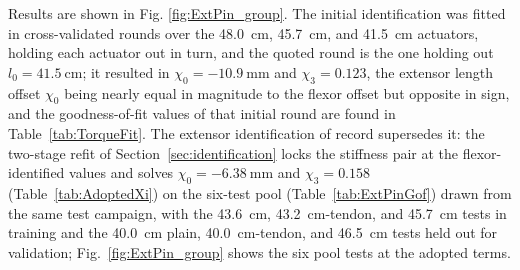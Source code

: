 Results are shown in Fig. \ref{fig:ExtPin_group}. The initial identification was fitted in cross-validated rounds over the \qty{48.0}{\cm}, \qty{45.7}{\cm}, and \qty{41.5}{\cm} actuators, holding each actuator out in turn, and the quoted round is the one holding out $l_{0}=\qty{41.5}{\cm}$; it resulted in $\chi_{0} = \qty{-10.9}{\mm}$ and $\chi_{3} = 0.123$, the extensor length offset $\chi_{0}$ being nearly equal in magnitude to the flexor offset but opposite in sign, and the goodness-of-fit values of that initial round are found in Table~\ref{tab:TorqueFit}. The extensor identification of record supersedes it: the two-stage refit of Section~\ref{sec:identification} locks the stiffness pair at the flexor-identified values and solves $\chi_{0} = \qty{-6.38}{\mm}$ and $\chi_{3} = 0.158$ (Table~\ref{tab:AdoptedXi}) on the six-test pool (Table~\ref{tab:ExtPinGof}) drawn from the same test campaign, with the \qty{43.6}{\cm}, \qty{43.2}{\cm}-tendon, and \qty{45.7}{\cm} tests in training and the \qty{40.0}{\cm} plain, \qty{40.0}{\cm}-tendon, and \qty{46.5}{\cm} tests held out for validation; Fig.~\ref{fig:ExtPin_group} shows the six pool tests at the adopted terms.
